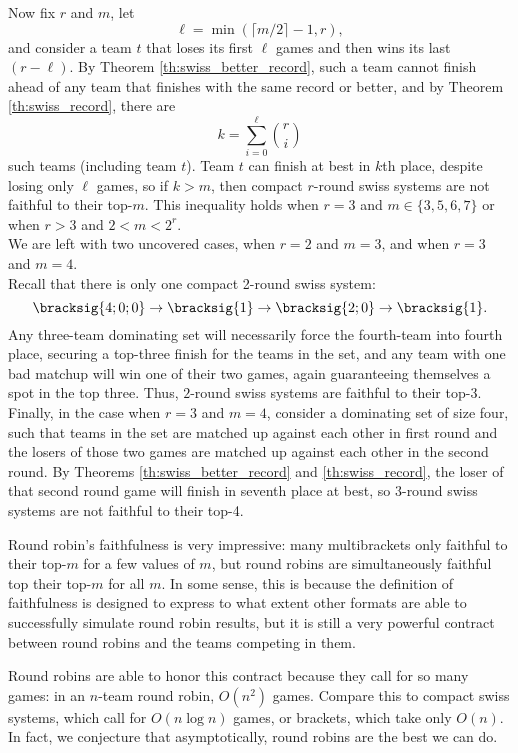 {{        Now fix $r$ and $m$, let $$\ell = \min(\lceil m / 2 \rceil - 1, r),$$ and consider a team $t$ that loses its first $\ell$ games and then wins its last $(r - \ell).$ By Theorem \ref{th:swiss_better_record}, such a team cannot finish ahead of any team that finishes with the same record or better, and by Theorem \ref{th:swiss_record}, there are $$k = \sum_{i=0}^\ell {\binom{r}{i}}$$ such teams (including team $t$). Team $t$ can finish at best in $k$th place, despite losing only $\ell$ games, so if $k > m$, then compact $r$-round swiss systems are not faithful to their top-$m$. This inequality holds when $r = 3$ and $m \in \{3, 5, 6, 7\}$ or when $r > 3$ and $2 < m < 2^r.$\\

        We are left with two uncovered cases, when $r = 2$ and $m = 3$, and when $r = 3$ and $m = 4.$\\

        Recall that there is only one compact 2-round swiss system: $$\bracksig{4;0;0} \to \bracksig{1} \to \bracksig{2;0} \to \bracksig{1}.$$ Any three-team dominating set will necessarily force the fourth-team into fourth place, securing a top-three finish for the teams in the set, and any team with one bad matchup will win one of their two games, again guaranteeing themselves a spot in the top three. Thus, $2$-round swiss systems are faithful to their top-3.\\

        Finally, in the case when $r = 3$ and $m = 4$, consider a dominating set of size four, such that teams in the set are matched up against each other in first round and the losers of those two games are matched up against each other in the second round. By Theorems \ref{th:swiss_better_record} and \ref{th:swiss_record}, the loser of that second round game will finish in seventh place at best, so $3$-round swiss systems are not faithful to their top-4.
    }{}

    Round robin's faithfulness is very impressive: many multibrackets only faithful to their top-$m$ for a few values of $m$, but round robins are simultaneously faithful top their top-$m$ for all $m.$ In some sense, this is because the definition of faithfulness is designed to express to what extent other formats are able to successfully simulate round robin results, but it is still a very powerful contract between round robins and the teams competing in them.

    Round robins are able to honor this contract because they call for so many games: in an $n$-team round robin, $O(n^2)$ games. Compare this to compact swiss systems, which call for $O(n\log n)$ games, or brackets, which take only $O(n).$ In fact, we conjecture that asymptotically, round robins are the best we can do.

}
